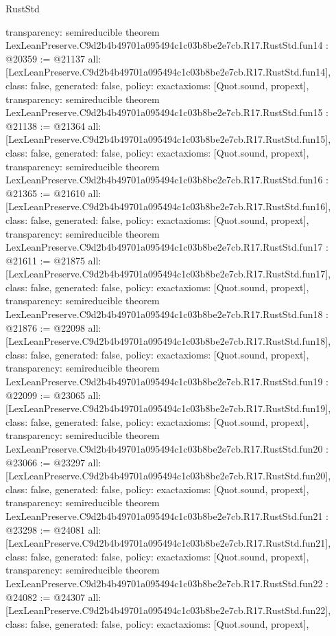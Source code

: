 \begin{lexlean}{RustStd}
\begin{coremodule}
{  transparency: semireducible
}
theorem LexLeanPreserve.C9d2b4b49701a095494c1c03b8be2e7cb.R17.RustStd.fun14 : @20359 := @21137 {
  all: [LexLeanPreserve.C9d2b4b49701a095494c1c03b8be2e7cb.R17.RustStd.fun14],
  class: false,
  generated: false,
  policy: exact{axioms: [Quot.sound, propext]},
  transparency: semireducible
}
theorem LexLeanPreserve.C9d2b4b49701a095494c1c03b8be2e7cb.R17.RustStd.fun15 : @21138 := @21364 {
  all: [LexLeanPreserve.C9d2b4b49701a095494c1c03b8be2e7cb.R17.RustStd.fun15],
  class: false,
  generated: false,
  policy: exact{axioms: [Quot.sound, propext]},
  transparency: semireducible
}
theorem LexLeanPreserve.C9d2b4b49701a095494c1c03b8be2e7cb.R17.RustStd.fun16 : @21365 := @21610 {
  all: [LexLeanPreserve.C9d2b4b49701a095494c1c03b8be2e7cb.R17.RustStd.fun16],
  class: false,
  generated: false,
  policy: exact{axioms: [Quot.sound, propext]},
  transparency: semireducible
}
theorem LexLeanPreserve.C9d2b4b49701a095494c1c03b8be2e7cb.R17.RustStd.fun17 : @21611 := @21875 {
  all: [LexLeanPreserve.C9d2b4b49701a095494c1c03b8be2e7cb.R17.RustStd.fun17],
  class: false,
  generated: false,
  policy: exact{axioms: [Quot.sound, propext]},
  transparency: semireducible
}
theorem LexLeanPreserve.C9d2b4b49701a095494c1c03b8be2e7cb.R17.RustStd.fun18 : @21876 := @22098 {
  all: [LexLeanPreserve.C9d2b4b49701a095494c1c03b8be2e7cb.R17.RustStd.fun18],
  class: false,
  generated: false,
  policy: exact{axioms: [Quot.sound, propext]},
  transparency: semireducible
}
theorem LexLeanPreserve.C9d2b4b49701a095494c1c03b8be2e7cb.R17.RustStd.fun19 : @22099 := @23065 {
  all: [LexLeanPreserve.C9d2b4b49701a095494c1c03b8be2e7cb.R17.RustStd.fun19],
  class: false,
  generated: false,
  policy: exact{axioms: [Quot.sound, propext]},
  transparency: semireducible
}
theorem LexLeanPreserve.C9d2b4b49701a095494c1c03b8be2e7cb.R17.RustStd.fun20 : @23066 := @23297 {
  all: [LexLeanPreserve.C9d2b4b49701a095494c1c03b8be2e7cb.R17.RustStd.fun20],
  class: false,
  generated: false,
  policy: exact{axioms: [Quot.sound, propext]},
  transparency: semireducible
}
theorem LexLeanPreserve.C9d2b4b49701a095494c1c03b8be2e7cb.R17.RustStd.fun21 : @23298 := @24081 {
  all: [LexLeanPreserve.C9d2b4b49701a095494c1c03b8be2e7cb.R17.RustStd.fun21],
  class: false,
  generated: false,
  policy: exact{axioms: [Quot.sound, propext]},
  transparency: semireducible
}
theorem LexLeanPreserve.C9d2b4b49701a095494c1c03b8be2e7cb.R17.RustStd.fun22 : @24082 := @24307 {
  all: [LexLeanPreserve.C9d2b4b49701a095494c1c03b8be2e7cb.R17.RustStd.fun22],
  class: false,
  generated: false,
  policy: exact{axioms: [Quot.sound, propext]},
}
\end{coremodule}
\end{lexlean}
